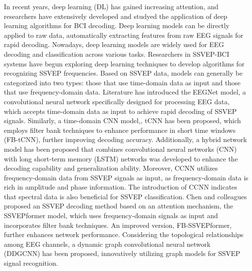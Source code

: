 \documentclass[10pt]{iopart}
\begin{document}
In recent years, deep learning (DL) has gained increasing attention\cite{krizhevsky2017imagenet}, and researchers have extensively developed and studyed the application of deep learning algorithms for BCI decoding\cite{zhou2018epileptic}. Deep learning models can be directly applied to raw data\cite{craik2019deep}, automatically extracting features from raw EEG signals for rapid decoding. Nowadays, deep learning models are widely used for EEG decoding and classification across various tasks. Researchers in SSVEP-BCI systems have begun exploring deep learning techniques to develop algorithms for recognizing SSVEP frequencies. Based on SSVEP data, models can generally be categorized into two types: those that use time-domain data as input and those that use frequency-domain data. Literature has introduced the EEGNet model\cite{lawhern2018eegnet}, a convolutional neural network specifically designed for processing EEG data, which accepts time-domain data as input to achieve rapid decoding of SSVEP signals. Similarly, a time-domain CNN model\cite{ding2021filter},, tCNN has been proposed, which employs filter bank techniques to enhance performance in short time windows (FB-tCNN), further improving decoding accuracy. Additionally, a hybrid network model has been proposed that combines convolutional neural networks (CNN) with long short-term memory (LSTM)\cite{pan2022efficient} networks was developed to enhance the decoding capability and generalization ability. Moreover, CCNN\cite{waytowich2018compact} utilizes frequency-domain data from SSVEP signals as input, as frequency-domain data is rich in amplitude and phase information. The introduction of CCNN indicates that spectral data is also beneficial for SSVEP classification. Chen and colleagues proposed an SSVEP decoding method based on an attention mechanism, the SSVEPformer model\cite{chen2023transformer}, which uses frequency-domain signals as input and incorporates filter bank techniques. An improved version, FB-SSVEPformer, further enhances network performance. Considering the topological relationships among EEG channels, a dynamic graph convolutional neural network (DDGCNN)\cite{zhang2024dynamic} has been proposed, innovatively utilizing graph models for SSVEP signal recognition.
\end{document}
